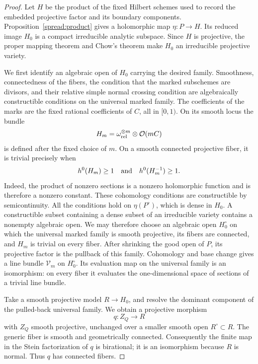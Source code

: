 \begin{proof}
Let \(H\) be the product of the fixed Hilbert schemes used to record
the embedded projective factor and its boundary components.
Proposition~\ref{spread:product} gives a holomorphic map
\(\eta:P\to H\).
Its reduced image \(H_0\) is a compact irreducible analytic subspace.
Since \(H\) is projective, the proper mapping theorem and Chow's
theorem make \(H_0\) an irreducible projective variety.

We first identify an algebraic open of \(H_0\) carrying the desired
family.  Smoothness, connectedness of the fibers, the condition that
the marked subschemes are divisors, and their relative simple normal
crossing condition are algebraically constructible conditions on the
universal marked family.  The coefficients of the marks are the fixed
rational coefficients of \(C\), all in \([0,1)\).
On its smooth locus the bundle
\[
 H_m=\omega_{\mathrm{rel}}^{\otimes m}\otimes\mathcal O(mC)
\]
is defined after the fixed choice of \(m\).  On a smooth connected
projective fiber, it is trivial precisely when
\[
 h^0(H_m)\geq1
 \quad\hbox{and}\quad
 h^0(H_m^{-1})\geq1.
\]
Indeed, the product of nonzero sections is a nonzero holomorphic
function and is therefore a nonzero constant.
These cohomology conditions are constructible by semicontinuity.
All the conditions hold on \(\eta(P^\circ)\), which is dense in
\(H_0\).  A constructible subset containing a dense subset of an
irreducible variety contains a nonempty algebraic open.
We may therefore choose an algebraic open \(H_0^\circ\) on which
the universal marked family is smooth projective, its fibers are
connected, and \(H_m\) is trivial on every fiber.
After shrinking the good open of \(P\), its projective factor is the
pullback of this family.
Cohomology and base change gives a line bundle
\(\mathcal V_m\) on \(H_0^\circ\).
Its evaluation map on the universal family is an isomorphism:
on every fiber it evaluates the one-dimensional space of sections
of a trivial line bundle.

Take a smooth projective model \(R\to H_0\), and resolve the
dominant component of the pulled-back universal family.  We obtain
a projective morphism
\[
 q:Z_Q\longrightarrow R
\]
with \(Z_Q\) smooth projective, unchanged over a smaller smooth
open \(R^\circ\subset R\).
The generic fiber is smooth and geometrically connected.
Consequently the finite map in the Stein factorization of \(q\)
is birational; it is an isomorphism because \(R\) is normal.
Thus \(q\) has connected fibers.


\end{proof}
